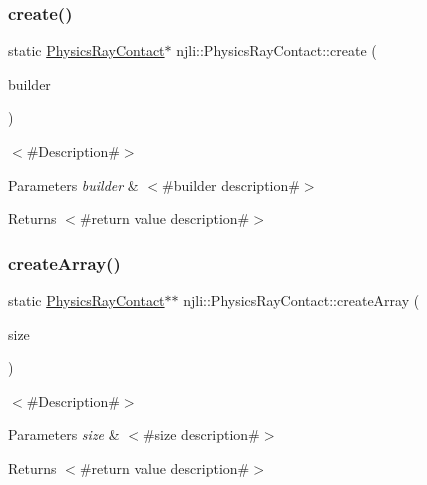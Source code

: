 \subsubsection{\texorpdfstring{create()}{create()}\hspace{0.1cm}{\footnotesize\ttfamily [3/3]}}
{\footnotesize\ttfamily static \mbox{\hyperlink{classnjli_1_1_physics_ray_contact}{Physics\+Ray\+Contact}}$\ast$ njli\+::\+Physics\+Ray\+Contact\+::create (\begin{DoxyParamCaption}\item[{const \mbox{\hyperlink{classnjli_1_1_physics_ray_contact_builder}{Physics\+Ray\+Contact\+Builder}} \&}]{builder }\end{DoxyParamCaption})\hspace{0.3cm}{\ttfamily [static]}}

$<$\#\+Description\#$>$


\begin{DoxyParams}{Parameters}
{\em builder} & $<$\#builder description\#$>$\\
\hline
\end{DoxyParams}
\begin{DoxyReturn}{Returns}
$<$\#return value description\#$>$ 
\end{DoxyReturn}
\mbox{\label{classnjli_1_1_physics_ray_contact_a4292b0c22fcabce21e8f7f066ef84812}} 
\subsubsection{\texorpdfstring{create\+Array()}{createArray()}}
{\footnotesize\ttfamily static \mbox{\hyperlink{classnjli_1_1_physics_ray_contact}{Physics\+Ray\+Contact}}$\ast$$\ast$ njli\+::\+Physics\+Ray\+Contact\+::create\+Array (\begin{DoxyParamCaption}\item[{const \mbox{\hyperlink{_util_8h_a10e94b422ef0c20dcdec20d31a1f5049}{u32}}}]{size }\end{DoxyParamCaption})\hspace{0.3cm}{\ttfamily [static]}}

$<$\#\+Description\#$>$


\begin{DoxyParams}{Parameters}
{\em size} & $<$\#size description\#$>$\\
\hline
\end{DoxyParams}
\begin{DoxyReturn}{Returns}
$<$\#return value description\#$>$ 
\end{DoxyReturn}
\mbox{\label{classnjli_1_1_physics_ray_contact_a7c45fca2b9c95f31d4fac45b3f20fff0}} 
